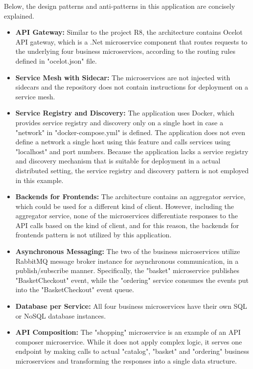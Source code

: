 \documentclass{Configuration_Files/PoliMi3i_thesis}
\begin{document}
Below, the design patterns and anti-patterns in this application are concisely explained.

\begin{itemize}
    \item \textbf{API Gateway:} Similar to the project R8, the architecture contains Ocelot API gateway, which is a .Net microservice component that routes requests to the underlying four business microservices, according to the routing rules defined in "ocelot.json" file.
    
    \item \textbf{Service Mesh with Sidecar:} The microservices are not injected with sidecars and the repository does not contain instructions for deployment on a service mesh.
    
    \item \textbf{Service Registry and Discovery:} The application uses Docker, which provides service registry and discovery only on a single host in case a "network" in "docker-compose.yml" is defined.
    The application does not even define a network a single host using this feature and calls services using "localhost" and port numbers.
    Because the application lacks a service registry and discovery mechanism that is suitable for deployment in a actual distributed setting, the service registry and discovery pattern is not employed in this example.
    
    \item \textbf{Backends for Frontends:} The architecture contains an aggregator service, which could be used for a different kind of client.
    However, including the aggregator service, none of the microservices differentiate responses to the API calls based on the kind of client, and for this reason, the backends for frontends pattern is not utilized by this application.
    
    \item \textbf{Asynchronous Messaging:} The two of the business microservices utilize RabbitMQ message broker instance for asynchronous communication, in a publish/subscribe manner.
    Specifically, the "basket" microservice publishes "BasketCheckout" event, while the "ordering" service consumes the events put into the "BasketCheckout" event queue.
    
    \item \textbf{Database per Service:} All four business microservices have their own SQL or NoSQL database instances.
    
    \item \textbf{API Composition:} The "shopping" microservice is an example of an API composer microservice.
    While it does not apply complex logic, it serves one endpoint by making calls to actual "catalog", "basket" and "ordering" business microservices and transforming the responses into a single data structure.
    

\end{itemize}
\end{document}
